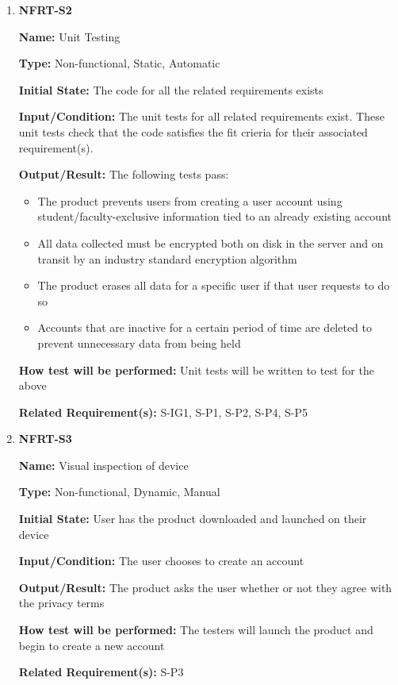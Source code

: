 \documentclass[12pt, titlepage]{article}
\begin{document}
\begin{enumerate}
\item{\textbf{NFRT-S2}}

\textbf{Name:} Unit Testing

\textbf{Type:} Non-functional, Static, Automatic
					
\textbf{Initial State:} The code for all the related requirements exists

\textbf{Input/Condition:} The unit tests for all related requirements exist. These unit tests check that the code satisfies the fit crieria for their associated requirement(s).

\textbf{Output/Result:} The following tests pass:
\begin{itemize}
  \item The product prevents users from creating a user account using student/faculty-exclusive information tied to an already existing account
  \item All data collected must be encrypted both on disk in the server and on transit by an industry standard encryption algorithm
  \item The product erases all data for a specific user if that user requests to do so
  \item Accounts that are inactive for a certain period of time are deleted to prevent unnecessary data from being held
\end{itemize}

\textbf{How test will be performed:} Unit tests will be written to test for the above

\textbf{Related Requirement(s):} S-IG1, S-P1, S-P2, S-P4, S-P5

\item{\textbf{NFRT-S3}}

\textbf{Name:} Visual inspection of device

\textbf{Type:} Non-functional, Dynamic, Manual

\textbf{Initial State:} User has the product downloaded and launched on their device

\textbf{Input/Condition:} The user chooses to create an account

\textbf{Output/Result:} The product asks the user whether or not they agree with the privacy terms

\textbf{How test will be performed:} The testers will launch the product and begin to create a new account

\textbf{Related Requirement(s):} S-P3

\end{enumerate}
\end{document}
